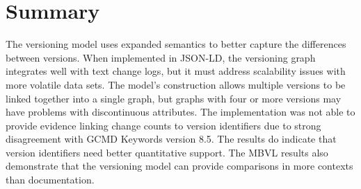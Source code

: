 \section{Summary}

The versioning model uses expanded semantics to better capture the differences between versions.
When implemented in JSON-LD, the versioning graph integrates well with text change logs, but it must address scalability issues with more volatile data sets.
The model's construction allows multiple versions to be linked together into a single graph, but graphs with four or more versions may have problems with discontinuous attributes.
The implementation was not able to provide evidence linking change counts to version identifiers due to strong disagreement with GCMD Keywords version 8.5.
The results do indicate that version identifiers need better quantitative support.
The MBVL results also demonstrate that the versioning model can provide comparisons in more contexts than documentation.
